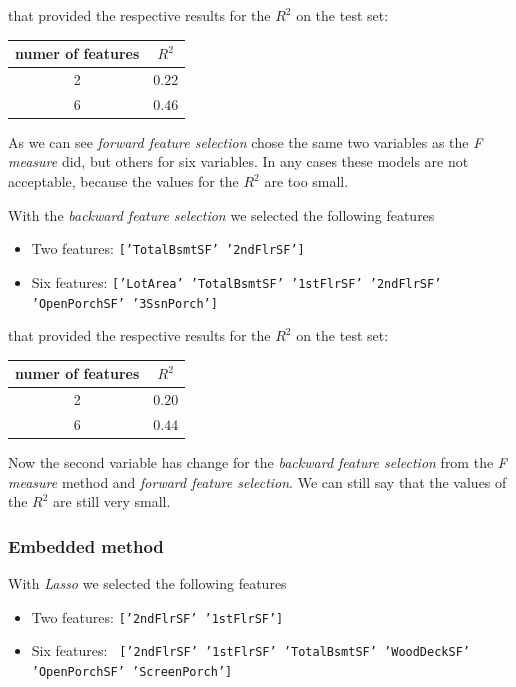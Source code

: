 \documentclass[a4paper,oneside,12pt]{article}
\begin{document}
that provided the respective results for the $R^2$ on the test set:
\begin{table}[H]
\centering
\begin{tabular}{|c|c|}
\hline
numer of features & $R^2$ \\
\hline
2  & $0.22$ \\
\hline
6  & $0.46$ \\
\hline

\end{tabular}
\end{table}

As we can see \textit{forward feature selection} chose the same two variables as the \textit{F measure} did, but others for six variables. In any cases these models are not acceptable, because the values for the $R^2$ are too small.

With the \textit{backward feature selection} we selected the following features 

\begin{itemize}
\item Two features: \texttt{['TotalBsmtSF' '2ndFlrSF']} 
\item Six features:  \texttt{['LotArea' 'TotalBsmtSF' '1stFlrSF' '2ndFlrSF' 'OpenPorchSF' '3SsnPorch']}
\end{itemize}

that provided the respective results for the $R^2$ on the test set:
\begin{table}[H]
\centering
\begin{tabular}{|c|c|}
\hline
numer of features & $R^2$ \\
\hline
2  & $0.20$ \\
\hline
6  & $0.44$ \\
\hline

\end{tabular}
\end{table}

Now the second variable has change for the \textit{backward feature selection} from the \textit{F measure} method and \textit{forward feature selection}. We can still say that the values of the $R^2$ are still very small.

\subsubsection{Embedded method}

With \textit{Lasso} we selected the following features 

\begin{itemize}
\item Two features: \texttt{['2ndFlrSF' '1stFlrSF']} 
\item Six features:  \texttt{ ['2ndFlrSF' '1stFlrSF' 'TotalBsmtSF' 'WoodDeckSF' 'OpenPorchSF' 'ScreenPorch']}
\end{itemize}
\end{document}
